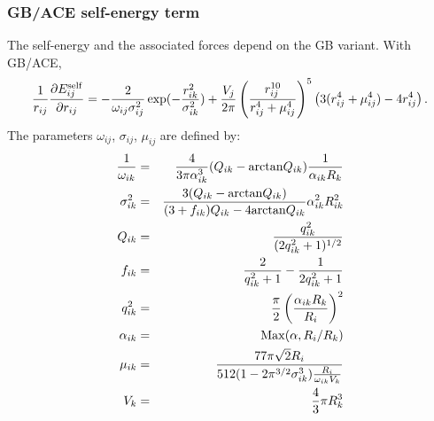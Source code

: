 \documentclass[12pt]{report}
\begin{document}
\subsubsection{GB/ACE self-energy term}
The self-energy and the associated forces depend on the GB variant. With GB/ACE,
\begin{equation} \label{eq:acef}
\frac{1}{r_{ij}} \frac{\partial E_{ij}^{\rm self}}{\partial r_{ij}} 
   = - \frac{2}{\omega_{ij}\sigma_{ij}^2} \exp(-\frac{r_{ik}^2}{\sigma^2_{ik}}) + 
       \frac{V_j}{2 \pi} \left( \frac{r_{ij}^{10}}{r_{ij}^4 + \mu^4_{ij}} \right)^5
                         \left( 3 (r_{ij}^4 + \mu^4_{ij}) - 4 r_{ij}^4 \right).
\end{equation}
The parameters $\omega_{ij}$, $\sigma_{ij}$, $\mu_{ij}$ are defined by:
\begin{eqnarray}
\frac{1}{\omega_{ik}} &=& \frac{4}{3 \pi \alpha_{ik}^3}
        (Q_{ik} - {\rm arctan} Q_{ik}) \frac{1}{\alpha_{ik} R_k} \\
\sigma_{ik}^2 &=& \frac{3 (Q_{ik} - {\rm arctan} Q_{ik})}
                       {(3+f_{ik})Q_{ik} - 4 {\rm arctan} Q_{ik}} \alpha_{ik}^2 R_{ik}^2 \\
Q_{ik} &=& \frac{q_{ik}^2}{(2q_{ik}^2 +1)^{1/2}}  \\
f_{ik} &=& \frac{2}{q_{ik}^2 +1} - \frac{1}{2q_{ik}^2 +1} \\
q_{ik}^2 &=& \frac{\pi}{2} \left( \frac{\alpha_{ik} R_k}{R_i}  \right)^2 \\
\alpha_{ik} &=& {\rm Max} ( \alpha, R_i/R_k ) \label{eq:alpha} \\
\mu_{ik} &=& \frac{ 77 \pi \sqrt{2} R_i }
              {512 ( 1 - 2 \pi^{3/2} \sigma_{ik}^3) \frac{R_i}{\omega_{ik} V_k} } \\
V_k &=& \frac{4}{3}\pi R_k^3 \label{eq:radius}
\end{eqnarray}
\end{document}
